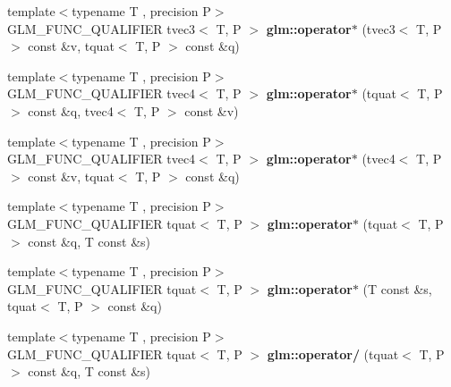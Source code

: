 \begin{DoxyCompactItemize}
\item 
\hypertarget{group__gtc__quaternion_ga70dbac44fc9fb59659218ad4ed7870ed}{{\footnotesize template$<$typename T , precision P$>$ }\\G\-L\-M\-\_\-\-F\-U\-N\-C\-\_\-\-Q\-U\-A\-L\-I\-F\-I\-E\-R tvec3$<$ T, P $>$ {\bfseries glm\-::operator$\ast$} (tvec3$<$ T, P $>$ const \&v, tquat$<$ T, P $>$ const \&q)}\label{group__gtc__quaternion_ga70dbac44fc9fb59659218ad4ed7870ed}

\item 
\hypertarget{group__gtc__quaternion_gaeee3d385665cb25b6d728524b8d8fa66}{{\footnotesize template$<$typename T , precision P$>$ }\\G\-L\-M\-\_\-\-F\-U\-N\-C\-\_\-\-Q\-U\-A\-L\-I\-F\-I\-E\-R tvec4$<$ T, P $>$ {\bfseries glm\-::operator$\ast$} (tquat$<$ T, P $>$ const \&q, tvec4$<$ T, P $>$ const \&v)}\label{group__gtc__quaternion_gaeee3d385665cb25b6d728524b8d8fa66}

\item 
\hypertarget{group__gtc__quaternion_ga9f4715d30e26cde878f16fef75b8e049}{{\footnotesize template$<$typename T , precision P$>$ }\\G\-L\-M\-\_\-\-F\-U\-N\-C\-\_\-\-Q\-U\-A\-L\-I\-F\-I\-E\-R tvec4$<$ T, P $>$ {\bfseries glm\-::operator$\ast$} (tvec4$<$ T, P $>$ const \&v, tquat$<$ T, P $>$ const \&q)}\label{group__gtc__quaternion_ga9f4715d30e26cde878f16fef75b8e049}

\item 
\hypertarget{group__gtc__quaternion_ga64f3ff448c382fd6642eafddd6ff65ea}{{\footnotesize template$<$typename T , precision P$>$ }\\G\-L\-M\-\_\-\-F\-U\-N\-C\-\_\-\-Q\-U\-A\-L\-I\-F\-I\-E\-R tquat$<$ T, P $>$ {\bfseries glm\-::operator$\ast$} (tquat$<$ T, P $>$ const \&q, T const \&s)}\label{group__gtc__quaternion_ga64f3ff448c382fd6642eafddd6ff65ea}

\item 
\hypertarget{group__gtc__quaternion_ga8b18b7e92f80b6b26550a1035bca33ba}{{\footnotesize template$<$typename T , precision P$>$ }\\G\-L\-M\-\_\-\-F\-U\-N\-C\-\_\-\-Q\-U\-A\-L\-I\-F\-I\-E\-R tquat$<$ T, P $>$ {\bfseries glm\-::operator$\ast$} (T const \&s, tquat$<$ T, P $>$ const \&q)}\label{group__gtc__quaternion_ga8b18b7e92f80b6b26550a1035bca33ba}

\item 
\hypertarget{group__gtc__quaternion_gab52fd3ac627908aa2aa1df96ddcdd113}{{\footnotesize template$<$typename T , precision P$>$ }\\G\-L\-M\-\_\-\-F\-U\-N\-C\-\_\-\-Q\-U\-A\-L\-I\-F\-I\-E\-R tquat$<$ T, P $>$ {\bfseries glm\-::operator/} (tquat$<$ T, P $>$ const \&q, T const \&s)}\label{group__gtc__quaternion_gab52fd3ac627908aa2aa1df96ddcdd113}


\end{DoxyCompactItemize}
